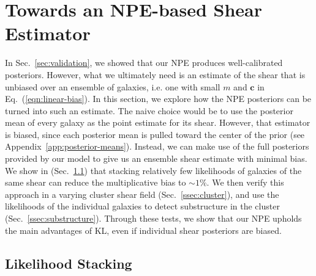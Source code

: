 \section{Towards an NPE-based Shear Estimator}
\label{sec:shear}

In Sec.~\ref{sec:validation}, we showed that our NPE produces well-calibrated posteriors. However, what we ultimately need is an estimate of the shear that is unbiased over an ensemble of galaxies, i.e. one with small $m$ and $\mathbf{c}$ in Eq.~(\ref{eqn:linear-bias}). In this section, we explore how the NPE posteriors can be turned into such an estimate. The naive choice would be to use the posterior mean of every galaxy as the point estimate for its shear. However, that estimator is biased, since each posterior mean is pulled toward the center of the prior (see Appendix~\ref{app:posterior-means}). Instead, we can make use of the full posteriors provided by our model to give us an ensemble shear estimate with minimal bias. We show in (Sec.~\ref{ssec:stacking}) that stacking relatively few likelihoods of galaxies of the same shear can reduce the multiplicative bias to $\sim1\%$. We then verify this approach in a varying cluster shear field (Sec.~\ref{ssec:cluster}), and use the likelihoods of the individual galaxies to detect substructure in the cluster (Sec.~\ref{ssec:substructure}). Through these tests, we show that our NPE upholds the main advantages of KL, even if individual shear posteriors are biased.

\subsection{Likelihood Stacking}
\label{ssec:stacking}

